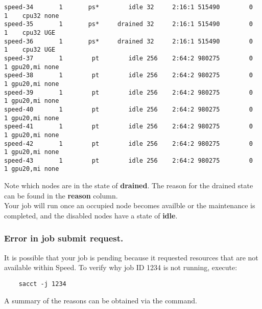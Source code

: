 \begin{verbatim}
speed-34       1       ps*        idle 32     2:16:1 515490        0      1    cpu32 none
speed-35       1       ps*     drained 32     2:16:1 515490        0      1    cpu32 UGE
speed-36       1       ps*     drained 32     2:16:1 515490        0      1    cpu32 UGE
speed-37       1        pt        idle 256    2:64:2 980275        0      1 gpu20,mi none
speed-38       1        pt        idle 256    2:64:2 980275        0      1 gpu20,mi none
speed-39       1        pt        idle 256    2:64:2 980275        0      1 gpu20,mi none
speed-40       1        pt        idle 256    2:64:2 980275        0      1 gpu20,mi none
speed-41       1        pt        idle 256    2:64:2 980275        0      1 gpu20,mi none
speed-42       1        pt        idle 256    2:64:2 980275        0      1 gpu20,mi none
speed-43       1        pt        idle 256    2:64:2 980275        0      1 gpu20,mi none
\end{verbatim}
\normalsize

\noindent Note which nodes are in the state of \textbf{drained}.
The reason for the drained state can be found in the \textbf{reason} column.\\

\noindent Your job will run once an occupied node becomes availble or the maintenance is completed, 
and the disabled nodes have a state of \textbf{idle}.

\subsubsection{Error in job submit request.}

It is possible that your job is pending because it requested resources that are not available within Speed. 
To verify why job ID 1234 is not running, execute:
\begin{verbatim} 
	sacct -j 1234
\end{verbatim}

\noindent
A summary of the reasons can be obtained via the  command.
